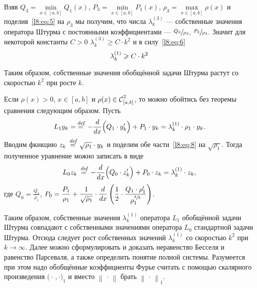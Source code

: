 \documentclass[12pt,a4paper,openany,fleqn]{book}
\newcommand {\defeq}{\stackrel{\hspace{0.09 cm}de\!f}{=}}
\newcommand {\eqdef}{\defeq}
\newcommand{\Cf}{\ensuremath{\mathcal{C}}}
\newcommand{\Cfn}[2][]{\ensuremath{\Cf{\mathstrut}^{#2}_{#1}}}
\newcommand{\der}[2]{\ensuremath{\frac{d#1}{d#2}}}
\newcommand{\norm}[1]{\ensuremath{\left\|#1\right\|}}
\theoremstyle{definition}
\begin{document}
	Взяв $Q_3=\displaystyle\min\limits_{x\in[a,b]}Q_1(x)$, $P_3=\displaystyle\min\limits_{x\in[a,b]}P_1(x)$, $\rho_3=\displaystyle\max\limits_{x\in[a,b]}\rho(x)$ и поделив~\eqref{l8:eq:5} на $\rho_3$ мы получим, что числа $\lambda_k^{(3)}$ --- собственные значения оператора Штурма с постоянными коэффициентами --- $\sfrac{Q_3}{\rho_3}$, $\sfrac{P_3}{\rho_3}$. Значит для некоторой константы $C>0$ $\lambda_k^{(3)}\geqslant C\cdot k^2$ и в силу~\eqref{l8:eq:6} 
	\begin{equation}\label{l8:eq:7}
	\hfill\lambda_k^{(1)}\geqslant C\cdot k^2\hfill
	\end{equation}
	
	Таким образом, собственные значения обобщённой задачи Штурма растут со скоростью $k^2$ при росте $k$.
	
	Если $\rho(x)>0$, $x\in[a,b]$ и $\rho(x)\in\Cfn[{[a,b]}]{2}$, то можно обойтись без теоремы сравнения следующим образом. Пусть
	\begin{equation}\label{l8:eq:8}
		\hfill L_1y_k=\eqdef-\der{}{x}\Big(Q_1\cdot y'_k\Big)+P_1\cdot y_k=\lambda_k^{(1)}\cdot\rho_1\cdot y_k.\hfill
	\end{equation}
	Вводим фкнкцию $z_k\eqdef\sqrt{\rho_1}\cdot y_k$ и поделим обе части~\eqref{l8:eq:8} на $\sqrt{\rho_1}$. Тогда полученное уравнение можно записать в виде
	\begin{equation}\label{l8:eq:9}
		\hfill L_0z_k\eqdef-\der{}{x}\Big(Q_0\cdot z'_k\Big)+P_0\cdot z_k=\lambda_k^{(1)}\cdot z_k,\hfill
	\end{equation}
	где $\displaystyle Q_0=\frac{Q_1}{\rho_1}$, $\displaystyle P_0=\frac{P_1}{\rho_1}+\frac1{\sqrt{\rho_1}}\cdot\der{}{x}\left(\frac12\cdot\frac{Q_1\cdot\rho'_1}{\rho_1^{\sfrac{3}{2}}}\right)$.
	
	Таким образом, собственные значения $\lambda_k^{(1)}$ оператора $L_1$ обобщённой задачи Штурма совпадают с собственными значениями оператора $L_0$ стандартной задачи Штурма. Отсюда следует рост собственных значений $\lambda_k^{(1)}$ со скоростью $k^2$ при $k\to\infty$. Далее можно сформулировать и доказать неравенство Бесселя и равенство Парсеваля, а также определить понятие полной системы. Разумеется при этом надо обобщённые коэффициенты Фурье считать с помощью скалярного произведения $\big(\cdot\,,\cdot\big)_1$ и вместо $\norm{\,\cdot\,}$ брать $\norm{\,\cdot\,}_1$.
	
\end{document}
